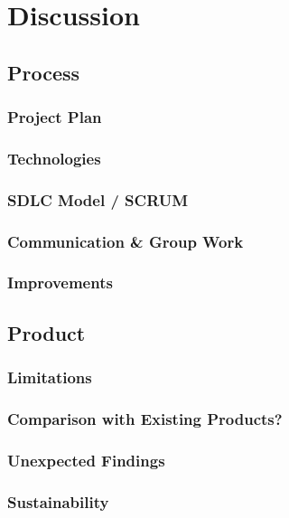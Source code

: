 \chapter{Discussion}
\section{Process}
\subsection{Project Plan}
\subsection{Technologies}
\subsection{SDLC Model / SCRUM}
\subsection{Communication \& Group Work}
\subsection{Improvements}
\section{Product}
\subsection{Limitations}
\subsection{Comparison with Existing Products?} 
\subsection{Unexpected Findings} %
\subsection{Sustainability} %
